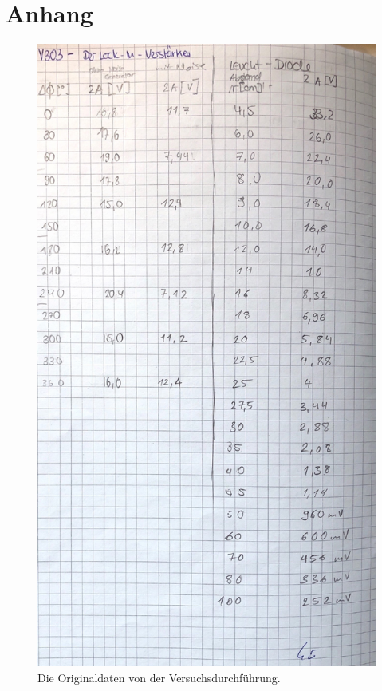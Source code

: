 \section{Anhang}
\label{sec:anhang}

\begin{figure}
    \centering
    \includegraphics[width=\textwidth]{bilder/data_v303.pdf}
    \caption{Die Originaldaten von der Versuchsdurchführung.}
    \label{fig:originaldaten}
\end{figure}